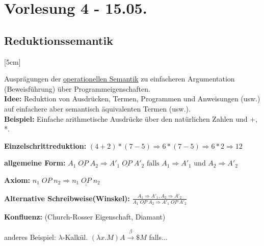 \section{Vorlesung 4 - 15.05.}
\subsection{Reduktionssemantik}
[5cm]


Ausprägungen der \underline{operationellen Semantik} zu einfacheren Argumentation (Beweisführung) über Programmeigenschaften.\\
\textbf{Idee:} Reduktion von Ausdrücken, Termen, Programmen und Anweisungen (usw.) auf einfachere aber semantisch äquivalenten Termen (usw.).\\
\textbf{Beispiel:} Einfache arithmetische Ausdrücke über den natürlichen Zahlen und +, *.
\begin{compactitem}
	\item[\textbf{Einzelschrittreduktion:}] $(4+2)*(7-5) \Rightarrow 6 * (7-5) \Rightarrow 6 * 2 \Rightarrow 12$
	\item[\textbf{allgemeine Form:}] $A_1\;\underline{OP}\;A_2 \Rightarrow A'_1\;\underline{OP}\;A'_2 \text{ falls } A_1 \Rightarrow A'_1 \text{ und } A_2 \Rightarrow A'_2$
	\item[\textbf{Axiom:}] $n_1\;OP\;n_2 \Rightarrow \underline{n_1\;\underline{OP}\;n_2}$
	\item[\textbf{Alternative Schreibweise(Winskel):}] $\frac {A_1 \Rightarrow A'_1, A_2 \Rightarrow A'_2} {A_1\;\underline{OP}\;A_2 \Rightarrow A'_1\;\underline{OP}\;A'_2}$
	\item[\textbf{Konfluenz:}] (Church-Rosser Eigenschaft, Diamant)\\
\end{compactitem}

anderes Beispiel: $\lambda$-Kalkül. $(\lambda x.M) A \xrightarrow{\beta}  \$ M$ falls...

